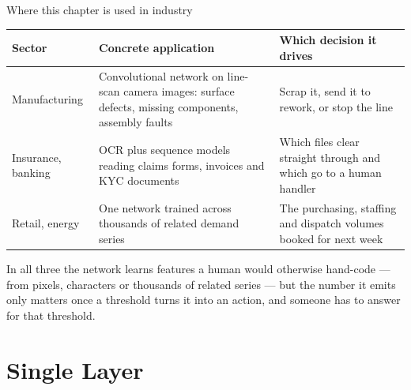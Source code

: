 \documentclass[aspectratio=169,11pt]{beamer}
\begin{document}
\begin{frame}{Where this chapter is used in industry}
  \scriptsize
  \begin{center}
  \begin{tabular}{@{}p{2.5cm}p{5.3cm}p{4.6cm}@{}}
    \toprule
    \textbf{Sector} & \textbf{Concrete application} & \textbf{Which decision it drives} \\
    \midrule
    Manufacturing & Convolutional network on line-scan camera images: surface defects,
      missing components, assembly faults & Scrap it, send it to rework, or stop the line \\
    Insurance, banking & OCR plus sequence models reading claims forms, invoices and KYC
      documents & Which files clear straight through and which go to a human handler \\
    Retail, energy & One network trained across thousands of related demand series &
      The purchasing, staffing and dispatch volumes booked for next week \\
    \bottomrule
  \end{tabular}
  \end{center}
  \begin{takeaway}
    In all three the network learns features a human would otherwise hand-code --- from
    pixels, characters or thousands of related series --- but the number it emits only
    matters once a threshold turns it into an action, and someone has to answer for
    that threshold.
  \end{takeaway}
\end{frame}


\section{Single Layer}
\end{document}
